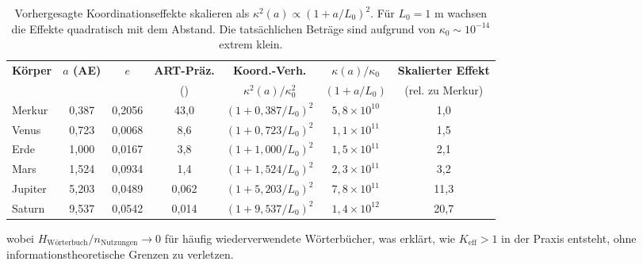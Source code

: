 \documentclass[11pt,a4paper]{article}
\begin{document}
	\begin{table}[htbp]
		\centering
		\footnotesize
		\begin{tabular}{lcccccc}
			\toprule
			\textbf{Körper} & \textbf{$a$ (AE)} & \textbf{$e$} & \textbf{ART-Präz.} & \textbf{Koord.-Verh.} & \textbf{$\kappa(a)/\kappa_0$} & \textbf{Skalierter Effekt} \\
			& & & (\text{Bogensek./Jh}) & $\kappa^2(a)/\kappa_0^2$ & $(1 + a/L_0)$ & (rel. zu Merkur) \\
			\midrule
			Merkur & 0,387 & 0,2056 & 43,0 & $(1 + 0,387/L_0)^2$ & $5,8\times10^{10}$ & 1,0 \\
			Venus & 0,723 & 0,0068 & 8,6 & $(1 + 0,723/L_0)^2$ & $1,1\times10^{11}$ & 1,5 \\
			Erde & 1,000 & 0,0167 & 3,8 & $(1 + 1,000/L_0)^2$ & $1,5\times10^{11}$ & 2,1 \\
			Mars & 1,524 & 0,0934 & 1,4 & $(1 + 1,524/L_0)^2$ & $2,3\times10^{11}$ & 3,2 \\
			Jupiter & 5,203 & 0,0489 & 0,062 & $(1 + 5,203/L_0)^2$ & $7,8\times10^{11}$ & 11,3 \\
			Saturn & 9,537 & 0,0542 & 0,014 & $(1 + 9,537/L_0)^2$ & $1,4\times10^{12}$ & 20,7 \\
			\bottomrule
		\end{tabular}
		\caption{Vorhergesagte Koordinationseffekte skalieren als $\kappa^2(a) \propto (1 + a/L_0)^2$. 
			Für $L_0 = 1$ m wachsen die Effekte quadratisch mit dem Abstand. Die tatsächlichen Beträge sind 
			aufgrund von $\kappa_0 \sim 10^{-14}$ extrem klein.}
		\label{tab:solar-system-keff}
	\end{table}
	wobei $H_{\text{Wörterbuch}}/n_{\text{Nutzungen}} \to 0$ für häufig wiederverwendete Wörterbücher, was erklärt, wie $K_{\mathrm{eff}} > 1$ in der Praxis entsteht, ohne informationstheoretische Grenzen zu verletzen.
	
\end{document}
